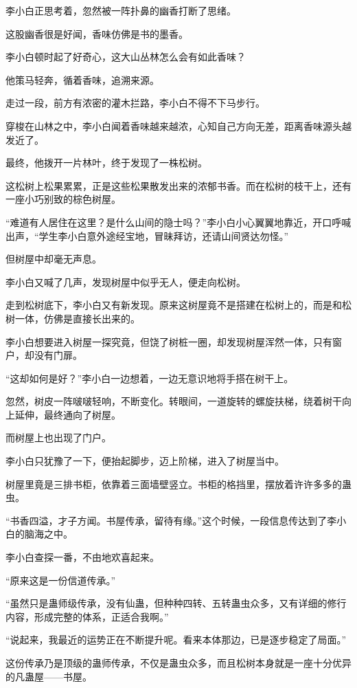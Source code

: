 \begin{this_body}
李小白正思考着，忽然被一阵扑鼻的幽香打断了思绪。

这股幽香很是好闻，香味仿佛是书的墨香。

李小白顿时起了好奇心，这大山丛林怎么会有如此香味？

他策马轻奔，循着香味，追溯来源。

走过一段，前方有浓密的灌木拦路，李小白不得不下马步行。

穿梭在山林之中，李小白闻着香味越来越浓，心知自己方向无差，距离香味源头越发近了。

最终，他拨开一片林叶，终于发现了一株松树。

这松树上松果累累，正是这些松果散发出来的浓郁书香。而在松树的枝干上，还有一座小巧别致的棕色树屋。

“难道有人居住在这里？是什么山间的隐士吗？”李小白小心翼翼地靠近，开口呼喊出声，“学生李小白意外途经宝地，冒昧拜访，还请山间贤达勿怪。”

但树屋中却毫无声息。

李小白又喊了几声，发现树屋中似乎无人，便走向松树。

走到松树底下，李小白又有新发现。原来这树屋竟不是搭建在松树上的，而是和松树一体，仿佛是直接长出来的。

李小白想要进入树屋一探究竟，但饶了树桩一圈，却发现树屋浑然一体，只有窗户，却没有门扉。

“这却如何是好？”李小白一边想着，一边无意识地将手搭在树干上。

忽然，树皮一阵啵啵轻响，不断变化。转眼间，一道旋转的螺旋扶梯，绕着树干向上延伸，最终通向了树屋。

而树屋上也出现了门户。

李小白只犹豫了一下，便抬起脚步，迈上阶梯，进入了树屋当中。

树屋里竟是三排书柜，依靠着三面墙壁竖立。书柜的格挡里，摆放着许许多多的蛊虫。

“书香四溢，才子方闻。书屋传承，留待有缘。”这个时候，一段信息传达到了李小白的脑海之中。

李小白查探一番，不由地欢喜起来。

“原来这是一份信道传承。”

“虽然只是蛊师级传承，没有仙蛊，但种种四转、五转蛊虫众多，又有详细的修行内容，形成完整的体系，正适合我啊。”

“说起来，我最近的运势正在不断提升呢。看来本体那边，已是逐步稳定了局面。”

这份传承乃是顶级的蛊师传承，不仅是蛊虫众多，而且松树本身就是一座十分优异的凡蛊屋——书屋。


\end{this_body}
